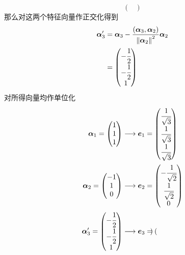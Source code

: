 {\begin{solution}
\[\begin{pmatrix}
            \end{pmatrix}
        \]那么对这两个特征向量作正交化得到\begin{align*}
            \bm{\alpha}_3' & =\bm{\alpha}_3-\frac{\left(
                \bm{\alpha}_3,\bm{\alpha}_2
            \right)}{\left\lVert\bm{\alpha}_2\right\rVert^2}\bm{\alpha}_2 \\
                           & =\begin{pmatrix}
                                  -\cfrac{1}{2} \\-\cfrac{1}{2}\\1
                              \end{pmatrix}
        \end{align*}对所得向量均作单位化\newpage\begin{align*}
            \bm{\alpha}_1=\begin{pmatrix}
                              1 \\1\\1
                          \end{pmatrix}    & \longrightarrow\bm{e}_1=\begin{pmatrix}
                                                                         \cfrac{1}{\sqrt{3}} \\\cfrac{1}{\sqrt{3}}\\\cfrac{1}{\sqrt{3}}
                                                                     \end{pmatrix}    \\
            \bm{\alpha}_2=\begin{pmatrix}
                              -1 \\1\\0
                          \end{pmatrix}    & \longrightarrow\bm{e}_2=\begin{pmatrix}
                                                                         -\cfrac{1}{\sqrt{2}} \\\cfrac{1}{\sqrt{2}}\\0
                                                                     \end{pmatrix}                                 \\
            \bm{\alpha}_3'=\begin{pmatrix}
                               -\cfrac{1}{2} \\-\cfrac{1}{2}\\1
                           \end{pmatrix} & \longrightarrow\bm{e}_3=\begin{pmatrix}

\end{pmatrix}
\end{align*}
\end{solution}}
